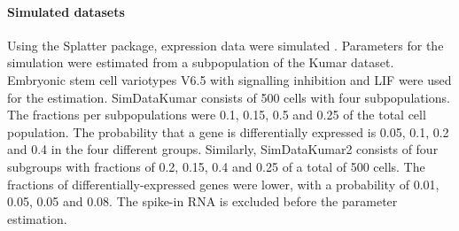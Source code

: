 \documentclass[12pt, a4paper]{article}\usepackage[]{graphicx}\usepackage[]{color}
\begin{document}
\paragraph{Simulated datasets }
Using the Splatter package, expression data were simulated \citep{oshlack2017splatter}. Parameters for the simulation were estimated from a subpopulation of the Kumar dataset.  Embryonic stem cell variotypes V6.5 with signalling inhibition and LIF were used for the estimation. SimDataKumar consists of 500 cells with four subpopulations. The fractions per subpopulations were 0.1, 0.15, 0.5 and 0.25 of the total cell population. The probability that a gene is differentially expressed is 0.05, 0.1, 0.2 and 0.4 in the four different groups. Similarly, SimDataKumar2 consists of four subgroups with fractions of 0.2, 0.15, 0.4 and 0.25 of a total of 500 cells. The fractions of differentially-expressed genes were lower, with a probability of 0.01, 0.05, 0.05 and 0.08. The spike-in RNA is excluded before the parameter estimation.

\begin{table}[htbp]
  \centering
  \caption{Summary statistics of the datasets. Shown are the number of cells, the number of subpopulations, the median library size, the median total read counts and the average silhouette widths.}
  \label{tbl:data}%
\end{table}%
\end{document}
